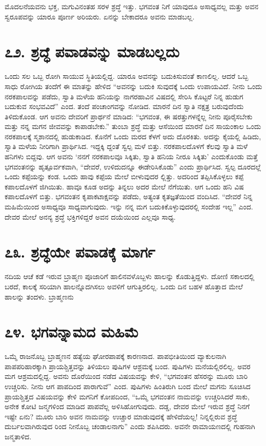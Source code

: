 ಮೊದಲನೆಯವನು ಭಕ್ತ, ಮಗುವಿನಂತಹ ಸರಳ ಶ್ರದ್ಧೆ ಇತ್ತು. ಭಗವಂತ ನಿಗೆ ಯಾವುದೂ ಅಸಾಧ್ಯವಲ್ಲ ಮತ್ತು ಅವನ ಸ್ವರೂಪವನ್ನು ಯಾರೂ ಪೂರ್ಣ ಅರಿಯರು. ಏನನ್ನು ಬೇಕಾದರೂ ಅವನು ಮಾಡಬಲ್ಲ.


\section{\num{೭೨. } ಶ್ರದ್ಧೆ ಪವಾಡವನ್ನು ಮಾಡಬಲ್ಲದು }

ಒಂದು ಸಲ ಒಬ್ಬ ರೋಗಿ ಸಾಯುವ ಸ್ಥಿತಿಯಲ್ಲಿದ್ದ. ಯಾರೂ ಅವನನ್ನು ಬದುಕಿಸುವಂತೆ ಕಾಣಲಿಲ್ಲ. ಆದರೆ ಒಬ್ಬ ಸಾಧು ರೋಗಿಯ ತಂದೆಗೆ ಈ ಮಾತನ್ನು ಹೇಳಿದ “ಅವನನ್ನು ಬದುಕಿ ಸುವುದಕ್ಕೆ ಒಂದು ಉಪಾಯವಿದೆ. ನೀನು ಒಂದು ನರಕಪಾಲವನ್ನು ಪಡೆದು, ಸ್ವಾತಿ ಮಳೆಯ ಹನಿಯನ್ನು ನಾಗರಹಾವಿನ ವಿಷದಲ್ಲಿ ಸೇರಿಸಿ ಕೊಟ್ಟರೆ ನಿನ್ನ ಹುಡುಗ ಬದುಕುವ ಸಂಭವವಿದೆ” ಎಂದ. ತಂದೆ ಪಂಚಾಂಗವನ್ನು ನೋಡಿದ. ಮಾರನೆ ದಿನ ಸ್ವಾತಿ ನಕ್ಷತ್ರ ಬರುವುದೆಂದು ತಿಳಿದುಕೊಂಡ. ಆಗ ಅವನು ದೇವರಿಗೆ ಪ್ರಾರ್ಥನೆ ಮಾಡಿದ: “ಭಗವಂತ, ಈ ಷರತ್ತುಗಳನ್ನೆಲ್ಲ ನೀನು ಪೂರೈಸಬೇಕು ಮತ್ತು ನನ್ನ ಮಗನ ಜೀವವನ್ನು ಕಾಪಾಡಬೇಕು.” ತುಂಬಾ ಶ್ರದ್ಧೆ ಮತ್ತು ಆಸೆಯಿಂದ ಮಾರನೆ ದಿನ ಸಾಯಂಕಾಲ ಒಂದು ನರಕಪಾಲಕ್ಕೆ ಸ್ಮಶಾನದಲ್ಲಿ ಹುಡುಕಾಡಿದ. ಕೊನೆಗೆ ಒಂದು ಮರದ ಕೆಳಗೆ ಅದು ದೊರಕಿತು. ಅದನ್ನು ಕೈಯಲ್ಲಿ ಹಿಡಿದು, ಸ್ವಾತಿ ಮಳೆಯ ನೀರಿಗಾಗಿ ಪ್ರಾರ್ಥಿಸಿದ. ಇದ್ದಕ್ಕಿ ದ್ದಂತೆ ಸ್ವಲ್ಪ ಮಳೆ ಬಿತ್ತು. ನರಕಪಾಲದೊಳಗೆ ಕೆಲವು ಸ್ವಾತಿ ಮಳೆ ಹನಿಗಳು ಬಿದ್ದವು. ಆಗ ಅವನು ‘ನನಗೆ ನರಕಪಾಲವೂ ಸಿಕ್ಕಿತು, ಸ್ವಾತಿ ಹನಿಯ ನೀರೂ ಸಿಕ್ಕಿತು’ ಎಂದುಕೊಂಡು ಮತ್ತೆ ಭಗವಂತನನ್ನು ಹೃತ್ಪೂರ್ವಕವಾಗಿ, “ದೇವರೆ, ಉಳಿದುದನ್ನೂ ಈಡೇರಿಸಿಕೊಡು” ಎಂದು ಪ್ರಾರ್ಥಿಸಿದ. ಸ್ವಲ್ಪ ದೂರದಲ್ಲೆ ಒಂದು ಕಪ್ಪೆಯನ್ನು ಕಂಡ. ಒಂದು ಹಾವು ಕಪ್ಪೆಯ ಮೇಲೆ ಬೀಳುವುದರ ಲ್ಲಿತ್ತು. ಅದರಿಂದ ತಪ್ಪಿಸಿಕೊಳ್ಳಲು ಕಪ್ಪೆ ಕಪಾಲದೊಳಗೆ ಜಿಗಿಯಿತು. ಹಾವೂ ಕೂಡ ಅದನ್ನು ತಿನ್ನಲು ಅದರ ಮೇಲೆ ನೆಗೆಯಿತು. ಆಗ ಒಂದು ಹನಿ ವಿಷ ಕಪಾಲದೊಳಗೆ ಬಿತ್ತು. ಭಗವಂತನ ಕೃಪಾಕಟಾಕ್ಷವನ್ನು ಪಡೆದು, ಅತ್ಯಂತ ಕೃತಜ್ಞತೆಯಿಂದ ವಂದಿಸಿದ. “ದೇವರೆ ನಿನ್ನ ಮಹಿಮೆಯಿಂದ ಅಸಾಧ್ಯವೂ ಸಾಧ್ಯವಾಗುವುದು. ಇನ್ನು ನನ್ನ ಮಗ ಬದುಕಿಕೊಳ್ಳುವುದರಲ್ಲಿ ಸಂದೇಹ ಇಲ್ಲ” ಎಂದ. ದೇವರ ಮೇಲೆ ಅನನ್ಯ ಶ್ರದ್ಧೆ ಭಕ್ತಿಗಳಿದ್ದರೆ ಅವನ ದಯೆಯಿಂದ ಎಲ್ಲವೂ ಸಾಧ್ಯ.


\section{\num{೭೩.} ಶ್ರದ್ಧೆಯೇ ಪವಾಡಕ್ಕೆ ಮಾರ್ಗ}

ನದಿಯ ಆಚೆ ಕಡೆ ಇರುವ ಬ್ರಾಹ್ಮಣ ಪೂಜಾರಿಗೆ ಹಾಲಿನವಳೊಬ್ಬಳು ಹಾಲನ್ನು ಕೊಡುತ್ತಿದ್ದಳು. ದೋಣಿ ಸಕಾಲದಲ್ಲಿ ಬರದೆ, ಕಾಲಕ್ಕೆ ಸರಿಯಾಗಿ ಹಾಲನ್ನೊದಗಿಸಲು ಅವಳಿಗೆ ಆಗುತ್ತಿರಲಿಲ್ಲ. ಒಂದು ದಿನ ಬಹಳ ಹೊತ್ತಾದ ಮೇಲೆ ಹಾಲನ್ನು ತಂದಳು. ಬ್ರಾಹ್ಮಣನು



\section{\num{೭೪.} ಭಗವನ್ನಾಮದ ಮಹಿಮೆ}

ಒಮ್ಮೆ ರಾಜನೊಬ್ಬ ಬ್ರಾಹ್ಮಣನ ಹತ್ಯೆಯ ಘೋರಪಾಪಕ್ಕೆ ಕಾರಣನಾದ. ಪಾಪಭೀತಿಯಿಂದ ವ್ಯಾಕುಲನಾಗಿ ಪಾಪಪರಿಹಾರಕ್ಕಾಗಿ ಪ್ರಾಯಶ್ಚಿತ್ತವನ್ನು ತಿಳಿಯಲು ಪುಷಿಗಳ ಆಶ್ರಮಕ್ಕೆ ಬಂದ. ಪುಷಿಗಳು ಮನೆಯಲ್ಲಿರಲಿಲ್ಲ. ಅವರ ಮಗ ಆಶ್ರಮದಲ್ಲಿದ್ದ. ಅವನು ದೊರೆಯಿಂದ ನಡೆದ ವಿಷಯವನ್ನು ಕೇಳಿ, “ಭಗವಂತನ ಹೆಸರನ್ನು ಮೂರು ಬಾರಿ ಉಚ್ಚರಿಸು. ನೀನು ಆಗ ಪಾಪದಿಂದ ಪಾರಾಗುವೆ” ಎಂದ. ಪುಷಿಗಳು ಹಿಂತಿರುಗಿ ಬಂದ ಮೇಲೆ ಮಗನು ಸೂಚಿಸಿದ ಪ್ರಾಯಶ್ಚಿತ್ತದ ವಿಷಯವನ್ನು ಕೇಳಿ ಮಗನಿಗೆ ಕೋಪದಿಂದ, “ಒಮ್ಮೆ ಭಗವಂತನ ನಾಮವನ್ನು ಉಚ್ಚರಿಸಿದರೆ ಸಾಕು, ಅನೇಕ ಕೋಟಿ ಜನ್ಮಗಳಿಂದ ಮಾಡಿದ ಪಾಪವೆಲ್ಲ ಅಳಿಸಿಹೋಗುವುದು. ದಡ್ಡ, ದೇವರ ಮೇಲೆ ಇರುವ ಶ್ರದ್ಧೆ ನಿನಗೆ ಇಷ್ಟೇ ಏನು? ಮೂರು ಬಾರಿ ಅವನ ನಾಮವನ್ನು ಉಚ್ಚಾರ ಮಾಡುವುದಕ್ಕೆ ಹೇಳಿದೆಯಲ್ಲ! ನಿನ್ನಲ್ಲಿರುವ ಶ್ರದ್ಧೆ ದುರ್ಬಲವಾಗಿರುವುದ ರಿಂದ ನೀನೊಬ್ಬ ಚಂಡಾಲನಾಗು” ಎಂದು ಶಪಿಸಿದರು. ಅವನೇ ರಾಮಾಯಣದಲ್ಲಿ ಗುಹನಾಗಿ ಜನ್ಮತಾಳಿದ.


